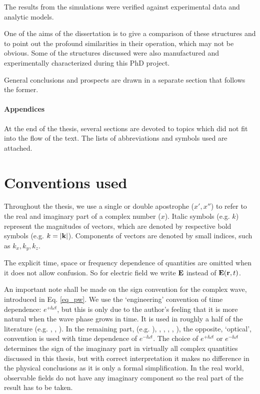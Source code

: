 The results from the simulations were verified against experimental data and analytic models.

One of the aims of the dissertation is to give a comparison of these structures and to point out the profound similarities in their operation, which may not be obvious.  Some of the structures discussed were also manufactured and experimentally characterized during this PhD project. 

General conclusions and prospects are drawn in a separate section that follows the former.
\paragraph{Appendices} %
At the end of the thesis, several sections are devoted to topics which did not fit into the flow of the text. 
The lists of abbreviations and symbols used are attached.


\section{Conventions used}%
Throughout the thesis, we use a single or double apostrophe ($x', x''$) to refer to the real and imaginary part of a complex number ($x$). Italic symbols (e.g. $k$) represent the magnitudes of vectors, which are denoted by respective bold symbols (e.g. $k = |{\mathbf{k}}|$). Components of vectors are denoted by small indices, such as $k_x, k_y, k_z$. 

The explicit time, space or frequency dependence of quantities are omitted when it does not allow confusion. So for electric field we write $\mathbf{E}$ instead of $\mathbf{E}({\mathbf{r}},t)$.

An important note shall be made on the sign convention for the complex wave, introduced in Eq. \ref{eq_pw}.
We use the `engineering' convention of time dependence: $e^{+\ii \omega t}$, but this is only due to the author's feeling that it is more natural when the wave phase grows in time. 
It is used in  roughly a half of the literature (e.g. \cite[p. 9]{engheta2006book}, \cite[pp. 21, 99]{krowne2007book}, \cite[(Chapters 1-4, 6, 9, 10)]{eleftheriades2005book}).  In the remaining part, (e.g. \cite[(Chapters 5, 7, 8)]{eleftheriades2005book}), \cite{klingshirn2007semiconductor}, \cite{jackson1962book}, \cite{veselago1968}, \cite{born1999book}, \cite[p. 5]{noginov2011book}), the opposite, `optical', convention is used with time dependence of $e^{-\ii \omega t}$. The choice of $e^{+\ii\omega t}$ or $e^{-\ii\omega t}$ determines the sign of the imaginary part in virtually all complex quantities discussed in this thesis, but with correct interpretation it makes no difference in the physical conclusions as it is only a formal simplification.
In the real world, observable fields do not have any imaginary component so the real part of the result has to be taken. 

